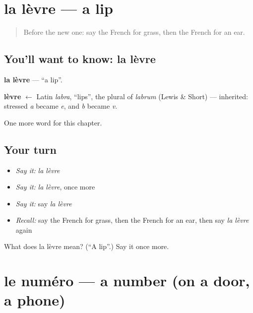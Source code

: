 \section[la lèvre]{la lèvre — a lip}

\label{lesson:FR-C134-levre}



\begin{quote}
Before the new one: say the French for grass, then the French for an ear.
\end{quote}

\subsection*{You'll want to know: la lèvre}
\textbf{la lèvre} — \textquotedblleft{}a lip\textquotedblright{}.

\begin{cousinweb}
\textbf{lèvre} $\leftarrow$ Latin \emph{labra}, \textquotedblleft{}lips\textquotedblright{}, the plural of \emph{labrum} (Lewis \& Short) — inherited: stressed \emph{a} became \emph{e}, and \emph{b} became \emph{v}.
\end{cousinweb}

\begin{grammarlens}[title={What you've built}]
One more word for this chapter.
\end{grammarlens}

\subsection*{Your turn}
\begin{itemize}
\raggedright
  \item \emph{Say it:} \emph{la lèvre}
  \item \emph{Say it:} \emph{la lèvre}, once more
  \item \emph{Say it:} say \emph{la lèvre}
  \item \emph{Recall:} say the French for grass, then the French for an ear, then say \emph{la lèvre} again
\end{itemize}

\begin{tcolorbox}[breakable,colback=teal!4,colframe=teal!35!black,title={Before you move on}]
What does la lèvre mean? (\textquotedblleft{}A lip\textquotedblright{}.) Say it once more.
\end{tcolorbox}
\section[le numéro]{le numéro — a number (on a door, a phone)}

